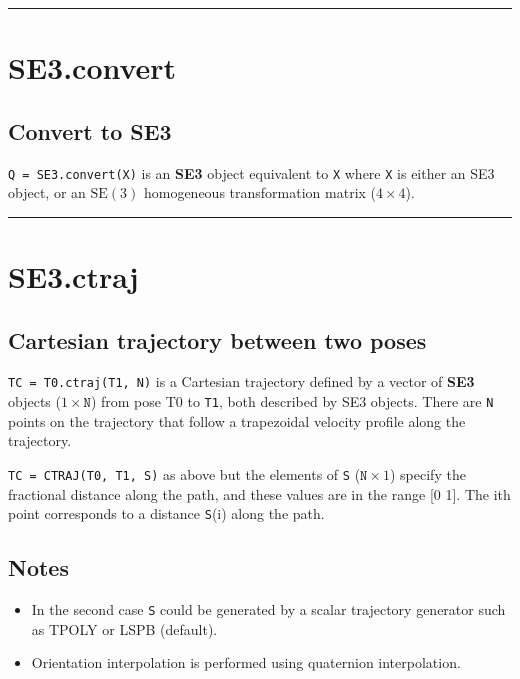 \vspace{1.5ex}\hrule

\hypertarget{SE3.convert}{\section*{SE3.convert}}
\subsection*{Convert to SE3}


\texttt{Q = SE3.convert(X)} is an \textbf{\color{red} SE3} object equivalent to \texttt{X} where \texttt{X} is either
an SE3 object, or an $\mbox{SE}(3)$ homogeneous transformation matrix ($4 \times 4$).

\vspace{1.5ex}\hrule

\hypertarget{SE3.ctraj}{\section*{SE3.ctraj}}
\subsection*{Cartesian trajectory between two poses}


\texttt{TC = T0.ctraj(T1, N)} is a Cartesian trajectory defined by a vector of \textbf{\color{red} SE3}
objects ($1 \times \texttt{N}$) from pose T0 to \texttt{T1}, both described by SE3 objects.  There
are \texttt{N} points on the trajectory that follow a trapezoidal velocity profile
along the trajectory.



\texttt{TC = CTRAJ(T0, T1, S)} as above but the elements of \texttt{S} ($\texttt{N} \times 1$) specify the
fractional distance  along the path, and these values are in the range [0 1].
The i\textquotesingle th point corresponds to a distance \texttt{S}(i) along the path.


\subsection*{Notes}
\begin{itemize}
  \item In the second case \texttt{S} could be generated by a scalar trajectory generator     such as TPOLY or LSPB (default).
  \item Orientation interpolation is performed using quaternion interpolation.
\end{itemize}

